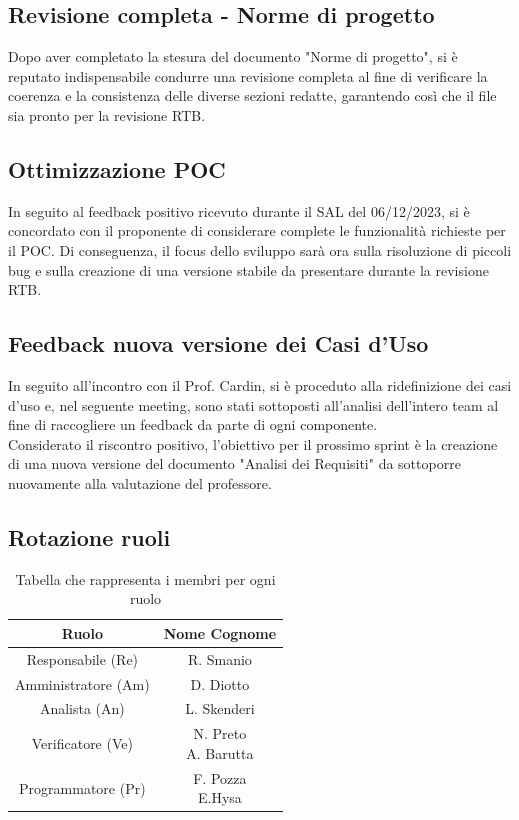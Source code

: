 \documentclass{article}
\begin{document}
    \subsection{Revisione completa - Norme di progetto}
    Dopo aver completato la stesura del documento "Norme di progetto", si è reputato indispensabile condurre una revisione completa al fine di verificare la coerenza e la consistenza delle diverse sezioni redatte, garantendo così che il file sia pronto per la revisione RTB.  
    \subsection{Ottimizzazione POC}
    In seguito al feedback positivo ricevuto durante il SAL del 06/12/2023, si è concordato con il proponente di considerare complete le funzionalità richieste per il POC. Di conseguenza, il focus dello sviluppo sarà ora sulla risoluzione di piccoli bug e sulla creazione di una versione stabile da presentare durante la revisione RTB.  
    \subsection{Feedback nuova versione dei Casi d'Uso}
    In seguito all'incontro con il Prof. Cardin, si è proceduto alla ridefinizione dei casi d'uso e, nel seguente meeting, sono stati sottoposti all'analisi dell'intero team al fine di raccogliere un feedback da parte di ogni componente.\\
    Considerato il riscontro positivo, l'obiettivo per il prossimo sprint è la creazione di una nuova versione del documento "Analisi dei Requisiti" da sottoporre nuovamente alla valutazione del professore.
    \subsection{Rotazione ruoli} 

    \begin{table}[H]
        \centering
        \begin{tabular}{|c|c|} 
            \hline
            \textbf{Ruolo} & \textbf{Nome Cognome} \\
            \hline \hline
            Responsabile (Re) & R. Smanio\\ 
            \hline
            Amministratore (Am) & D. Diotto\\ 
            \hline
            Analista (An) & L. Skenderi \\
            \hline
            Verificatore (Ve) & \makecell{N. Preto\\A. Barutta } \\
            \hline
            Programmatore (Pr) & \makecell{F. Pozza\\E.Hysa } \\
            \hline
        \end{tabular}
        \caption{Tabella che rappresenta i membri per ogni ruolo}
    \end{table}
\end{document}
